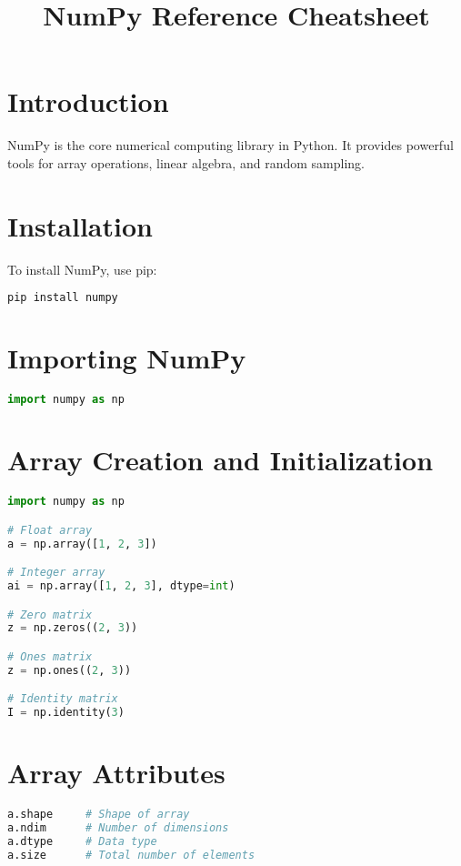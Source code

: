 \documentclass{article}
\title{NumPy Reference Cheatsheet}
\date{}
\begin{document}
\maketitle

\section{Introduction}
NumPy is the core numerical computing library in Python. It provides powerful tools for array operations, linear algebra, and random sampling.

\section{Installation}
To install NumPy, use pip:
\begin{lstlisting}[language=bash]
pip install numpy
\end{lstlisting}

\section{Importing NumPy}
\begin{lstlisting}[language=Python]
import numpy as np
\end{lstlisting}

\section{Array Creation and Initialization}
\begin{lstlisting}[language=Python]
import numpy as np

# Float array
a = np.array([1, 2, 3])

# Integer array
ai = np.array([1, 2, 3], dtype=int)

# Zero matrix
z = np.zeros((2, 3))

# Ones matrix
z = np.ones((2, 3))

# Identity matrix
I = np.identity(3)

\end{lstlisting}


\section{Array Attributes}
\begin{lstlisting}[language=Python]
a.shape     # Shape of array
a.ndim      # Number of dimensions
a.dtype     # Data type
a.size      # Total number of elements
\end{lstlisting}
\end{document}
